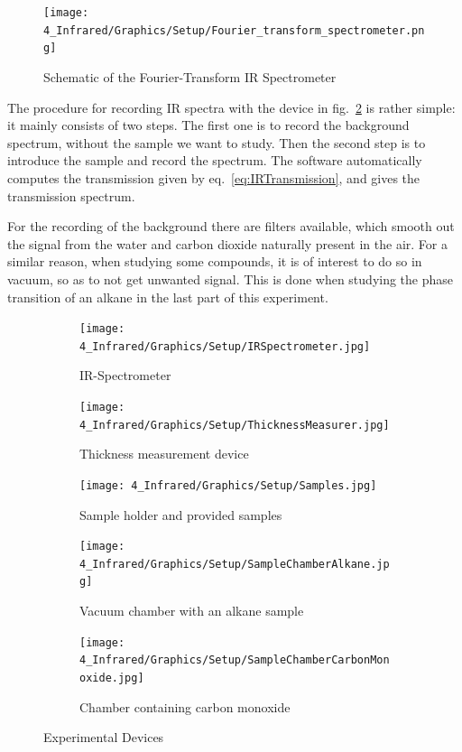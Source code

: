 \documentclass[12pt]{article}
\begin{document}
\begin{figure}[!ht]
    \centering
    \texttt{[image: 4\_Infrared/Graphics/Setup/Fourier\_transform\_spectrometer.png]}
    \caption{Schematic of the Fourier-Transform IR Spectrometer}
    \label{fig:SchematicFTIRSpectrometer}
\end{figure}
\FloatBarrier

The procedure for recording IR spectra with the device in fig.~\ref{fig:IRSpectrometer} is rather simple: it mainly consists of two steps. The first one is to record the background spectrum, without the sample we want to study. Then the second step is to introduce the sample and record the spectrum. The software automatically computes the transmission given by eq.~\ref{eq:IRTransmission}, and gives the transmission spectrum.

For the recording of the background there are filters available, which smooth out the signal from the water and carbon dioxide naturally present in the air. For a similar reason, when studying some compounds, it is of interest to do so in vacuum, so as to not get unwanted signal. This is done when studying the phase transition of an alkane in the last part of this experiment.

\begin{figure}[ht]
    \begin{subfigure}[c]{0.5\textwidth}
        \centering
        \texttt{[image: 4\_Infrared/Graphics/Setup/IRSpectrometer.jpg]}
        \caption{IR-Spectrometer}
        \label{fig:IRSpectrometer}
    \end{subfigure}
    \hfill
    \begin{subfigure}[c]{0.5\textwidth}
        \centering
        \texttt{[image: 4\_Infrared/Graphics/Setup/ThicknessMeasurer.jpg]}
        \caption{Thickness measurement device}
    \end{subfigure}
    
    \begin{subfigure}[c]{0.32\textwidth}
        \centering
        \texttt{[image: 4\_Infrared/Graphics/Setup/Samples.jpg]}
        \caption{Sample holder and provided samples}
    \end{subfigure}
    \hfill
    \begin{subfigure}[c]{0.32\textwidth}
        \centering
        \texttt{[image: 4\_Infrared/Graphics/Setup/SampleChamberAlkane.jpg]}
        \caption{Vacuum chamber with an alkane sample}
    \end{subfigure}
    \hfill
    \begin{subfigure}[c]{0.32\textwidth}
        \centering
        \texttt{[image: 4\_Infrared/Graphics/Setup/SampleChamberCarbonMonoxide.jpg]}
        \caption{Chamber containing carbon monoxide}
    \end{subfigure}
    \caption{Experimental Devices}
    \label{fig:ExperimentalDevices}
\end{figure}
\FloatBarrier
\end{document}
